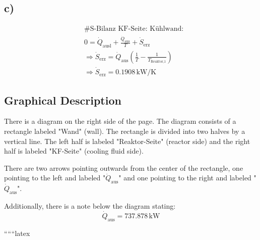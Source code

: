 

\subsection*{c)}

\begin{align*}
&\text{\# S-Bilanz KF-Seite: Kühlwand:} \\
&0 = \dot{Q}_{\text{ausl}} + \frac{\dot{Q}_{\text{aus}}}{T} + \dot{S}_{\text{erz}} \\
&\Rightarrow \dot{S}_{\text{erz}} = \dot{Q}_{\text{aus}} \left( \frac{1}{T} - \frac{1}{T_{\text{Reaktor,1}}} \right) \\
&\Rightarrow \dot{S}_{\text{erz}} = 0.1908 \, \text{kW/K}
\end{align*}

\subsection*{Graphical Description}

There is a diagram on the right side of the page. The diagram consists of a rectangle labeled "Wand" (wall). The rectangle is divided into two halves by a vertical line. The left half is labeled "Reaktor-Seite" (reactor side) and the right half is labeled "KF-Seite" (cooling fluid side). 

There are two arrows pointing outwards from the center of the rectangle, one pointing to the left and labeled "\(\dot{Q}_{\text{aus}}\)" and one pointing to the right and labeled "\(\dot{Q}_{\text{aus}}\)". 

Additionally, there is a note below the diagram stating:
\[
\dot{Q}_{\text{aus}} = 737.878 \, \text{kW}
\]

``````latex